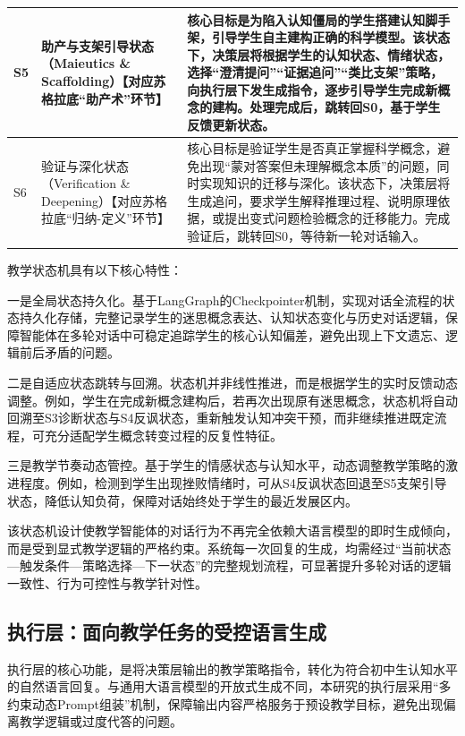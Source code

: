 \begin{table}[htbp]
{\begin{tabular}{|p{2cm}|p{6cm}|p{8cm}|}
\hline
S5 & 助产与支架引导状态（Maieutics \& Scaffolding）\newline【对应苏格拉底“助产术”环节】 & 核心目标是为陷入认知僵局的学生搭建认知脚手架，引导学生自主建构正确的科学模型。该状态下，决策层将根据学生的认知状态、情绪状态，选择“澄清提问”“证据追问”“类比支架”策略，向执行层下发生成指令，逐步引导学生完成新概念的建构。处理完成后，跳转回S0，基于学生反馈更新状态。 \\
\hline
S6 & 验证与深化状态（Verification \& Deepening）\newline【对应苏格拉底“归纳-定义”环节】 & 核心目标是验证学生是否真正掌握科学概念，避免出现“蒙对答案但未理解概念本质”的问题，同时实现知识的迁移与深化。该状态下，决策层将生成追问，要求学生解释推理过程、说明原理依据，或提出变式问题检验概念的迁移能力。完成验证后，跳转回S0，等待新一轮对话输入。 \\
\hline
\end{tabular}%
}
\end{table}

教学状态机具有以下核心特性：

一是全局状态持久化。基于LangGraph的Checkpointer机制，实现对话全流程的状态持久化存储，完整记录学生的迷思概念表达、认知状态变化与历史对话逻辑，保障智能体在多轮对话中可稳定追踪学生的核心认知偏差，避免出现上下文遗忘、逻辑前后矛盾的问题。

二是自适应状态跳转与回溯。状态机并非线性推进，而是根据学生的实时反馈动态调整。例如，学生在完成新概念建构后，若再次出现原有迷思概念，状态机将自动回溯至S3诊断状态与S4反讽状态，重新触发认知冲突干预，而非继续推进既定流程，可充分适配学生概念转变过程的反复性特征。

三是教学节奏动态管控。基于学生的情感状态与认知水平，动态调整教学策略的激进程度。例如，检测到学生出现挫败情绪时，可从S4反讽状态回退至S5支架引导状态，降低认知负荷，保障对话始终处于学生的最近发展区内。

该状态机设计使教学智能体的对话行为不再完全依赖大语言模型的即时生成倾向，而是受到显式教学逻辑的严格约束。系统每一次回复的生成，均需经过“当前状态—触发条件—策略选择—下一状态”的完整规划流程，可显著提升多轮对话的逻辑一致性、行为可控性与教学针对性。

\subsection{执行层：面向教学任务的受控语言生成}

执行层的核心功能，是将决策层输出的教学策略指令，转化为符合初中生认知水平的自然语言回复。与通用大语言模型的开放式生成不同，本研究的执行层采用“多约束动态Prompt组装”机制，保障输出内容严格服务于预设教学目标，避免出现偏离教学逻辑或过度代答的问题。

